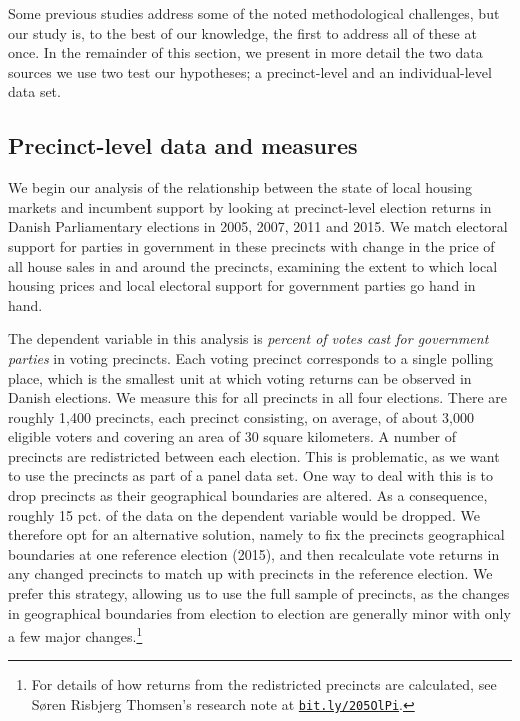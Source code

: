\documentclass[12pt,a4paper]{article}
\begin{document}
	Some previous studies address some of the noted methodological challenges, but our study is, to the best of our knowledge, the first to address all of these at once. In the remainder of this section, we present in more detail the two data sources we use two test our hypotheses; a precinct-level and an individual-level data set.
	
	\subsection{Precinct-level data and measures}\label{precinctlevel}
	We begin our analysis of the relationship between the state of local housing markets and incumbent support by looking at precinct-level election returns in Danish Parliamentary elections in 2005, 2007, 2011 and 2015. We match electoral support for parties in government in these precincts with change in the price of all house sales in and around the precincts, examining the extent to which local housing prices and local electoral support for government parties go hand in hand.
	
	The dependent variable in this analysis is \textit{percent of votes cast for government parties} in voting precincts. Each voting precinct corresponds to a single polling place, which is the smallest unit at which voting returns can be observed in Danish elections. We measure this for all precincts in all four elections. There are roughly 1,400 precincts, each precinct consisting, on average, of about 3,000 eligible voters and covering an area of 30 square kilometers. A number of precincts are redistricted between each election. This is problematic, as we want to use the precincts as part of a panel data set. One way to deal with this is to drop precincts as their geographical boundaries are altered. As a consequence, roughly 15 pct. of the data on the dependent variable would be dropped. We therefore opt for an alternative solution, namely to fix the precincts geographical boundaries at one reference election (2015), and then recalculate vote returns in any changed precincts to match up with precincts in the reference election. We prefer this strategy, allowing us to use the full sample of precincts, as the changes in geographical boundaries from election to election are generally minor with only a few major changes.\footnote{For details of how returns from the redistricted precincts are calculated, see Søren Risbjerg Thomsen's research note at \texttt{\href{http://bit.ly/205OlPi}{bit.ly/205OlPi}}.}
	
\end{document}
